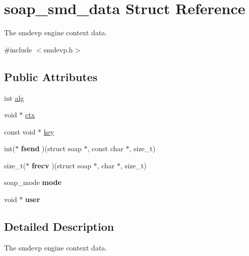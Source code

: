 \hypertarget{structsoap__smd__data}{
\section{soap\_\-smd\_\-data Struct Reference}
\label{structsoap__smd__data}
}


The smdevp engine context data.  




{\ttfamily \#include $<$smdevp.h$>$}

\subsection*{Public Attributes}
\begin{DoxyCompactItemize}
\item 
int \hyperlink{structsoap__smd__data_a15caa8c87ff69d8910feb374dde9ebae}{alg}
\item 
void $\ast$ \hyperlink{structsoap__smd__data_a670571247f5bbe3c1ee0c56c797cab6a}{ctx}
\item 
const void $\ast$ \hyperlink{structsoap__smd__data_a6656967fef65051e2a8061829211016d}{key}
\item 
\hypertarget{structsoap__smd__data_a3ff2700260fa8de174b2b0f8ca47072c}{
int($\ast$ {\bfseries fsend} )(struct soap $\ast$, const char $\ast$, size\_\-t)}
\label{structsoap__smd__data_a3ff2700260fa8de174b2b0f8ca47072c}

\item 
\hypertarget{structsoap__smd__data_a9e66c17ee75fe1ab7f367ffd09429885}{
size\_\-t($\ast$ {\bfseries frecv} )(struct soap $\ast$, char $\ast$, size\_\-t)}
\label{structsoap__smd__data_a9e66c17ee75fe1ab7f367ffd09429885}

\item 
\hypertarget{structsoap__smd__data_a13fd3231bbec058ac83083bb77d86705}{
soap\_\-mode {\bfseries mode}}
\label{structsoap__smd__data_a13fd3231bbec058ac83083bb77d86705}

\item 
\hypertarget{structsoap__smd__data_af516e9b676f4666607b0eb040fd0e9db}{
void $\ast$ {\bfseries user}}
\label{structsoap__smd__data_af516e9b676f4666607b0eb040fd0e9db}

\end{DoxyCompactItemize}


\subsection{Detailed Description}
The smdevp engine context data. 

